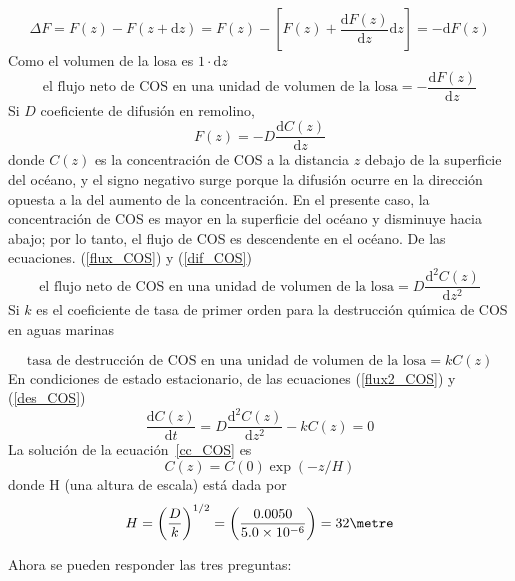 \begin{example}
\begin{equation}
\Delta F=F(z)-F(z+\mathrm{d}z)=F(z)-\left[ F(z)+\frac{\mathrm{d}F(z)}{\mathrm{d}z}\mathrm{d}z \right]=-\mathrm{d}F(z)
\end{equation}
Como el volumen de la losa es $1\cdot \mathrm{d}z$ 
\begin{equation}
\textrm{el flujo neto de COS en una unidad de volumen de la losa} =-\frac{\mathrm{d}F(z)}{\mathrm{d}z}
\label{flux_COS}
\end{equation}
Si $D$ coeficiente de difusión en remolino,
\begin{equation}
F(z)=-D\frac{\mathrm{d}C(z)}{\mathrm{d}z}
\label{dif_COS}
\end{equation}
donde $C(z)$ es la concentración de COS a la distancia $z$ debajo de la superficie del océano, y el signo negativo surge porque la difusión ocurre en la dirección opuesta a la del aumento de la concentración. En el presente caso, la concentración de COS es mayor en la superficie del océano y disminuye hacia abajo; por lo tanto, el flujo de COS es descendente en el océano. De las ecuaciones. (\ref{flux_COS}) y (\ref{dif_COS})
\begin{equation}
\textrm{el flujo neto de COS en una unidad de volumen de la losa} =D\frac{\mathrm{d}^2C(z)}{\mathrm{d}z^2}
\label{flux2_COS}
\end{equation}
\noindent Si $k$ es el coeficiente de tasa de primer orden para la destrucción qu\'{\i}mica de COS en aguas marinas 

\begin{equation}
\textrm{tasa de destrucción de COS en una unidad de volumen de la losa} =kC(z)
\label{des_COS}
\end{equation}
\noindent En condiciones de estado estacionario, de las ecuaciones (\ref{flux2_COS}) y  (\ref{des_COS})
\begin{equation}
\frac{\mathrm{d}C(z)}{\mathrm{d}t}=D\frac{\mathrm{d}^2C(z)}{\mathrm{d}z^2}-kC(z)=0
\label{cc_COS}
\end{equation}
La solución de la ecuación~\ref{cc_COS} es
\begin{equation}
C(z)=C(0)\exp(-z/H)
\label{c_cos}
\end{equation}
\noindent donde H (una altura de escala) está dada por
\begin{equation}
H=\left( \frac{D}{k}\right)^{1/2} =  \left( \frac{0.0050}{5.0\times10^{-6}}\right)=32 \metre
\label{H_COS}
\end{equation}

Ahora se pueden responder las tres preguntas:


\end{example}
